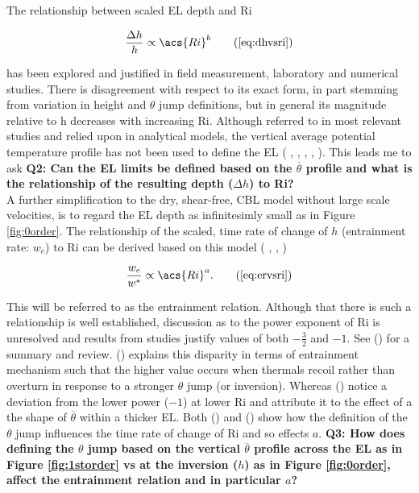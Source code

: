 The relationship between scaled \acs{EL} depth and \acs{Ri} 

\begin{equation} 
\frac{\Delta h}{h} \propto  \acs{Ri}^{b} \tag{\ref{eq:dhvsri}}
\end{equation}

has been explored and justified in field measurement, laboratory and numerical studies.  There is disagreement with respect to its exact form, in part stemming from variation in height and $\theta$ jump definitions, but in general its magnitude relative to h decreases with increasing \acs{Ri}. Although referred to in most relevant studies and relied upon in analytical models, the vertical average potential temperature profile has not been used to define the \acs{EL} (\citeauthor{DearWill80} \citeyear{DearWill80}, \citeauthor{StullNelEl} \citeyear{StullNelEl}, \citeauthor{FedConzMir04} \citeyear{FedConzMir04}, \citeauthor{Boers89} \citeyear{Boers89}, \citeauthor{BrooksFowler2} \citeyear{BrooksFowler2}). This leads me to ask \textbf{Q2: Can the \acs{EL} limits be defined based on the $\overline{\theta}$ profile and what is the relationship of the resulting depth ($\Delta h$) to \acs{Ri}?}\\


A further simplification to the dry, shear-free, \acs{CBL} model without large scale velocities, is to regard the \acs{EL} depth as infinitesimly small as in Figure \ref{fig:0order}.  The relationship of the scaled, time rate of change of $h$ (entrainment rate: $w_{e}$) to \acs{Ri} can be derived based on this model (\citeauthor{Tennekes73} \citeyear{Tennekes73}, \citeauthor{Deardorff79} \citeyear{Deardorff79}, \citeauthor{FedConzMir04} \citeyear{FedConzMir04})

\begin{equation}
\frac{w_{e}}{w^{*}} \propto  \acs{Ri}^{a}.\tag{\ref{eq:ervsri}} 
\end{equation}
 
This will be referred to as the entrainment relation.  Although that there is such a relationship is well established, discussion as to the power exponent of \acs{Ri} is unresolved and results from studies justify values of both $-\frac{3}{2}$ and $-1$. See \citeauthor{Traum11} (\citeyear{Traum11}) for a summary and review.  \citeauthor{Turner86} (\citeyear{Turner86}) explains this disparity in terms of entrainment mechanism such that the higher value occurs when thermals recoil rather than overturn in response to a stronger $\theta$ jump (or inversion).  Whereas \citeauthor{SullMoengStev} (\citeyear{SullMoengStev}) notice a deviation from the lower power ($-1$) at lower \acs{Ri} and attribute it to the effect of a the shape of $\overline{\theta}$ within a thicker \acs{EL}.  Both \citeauthor{FedConzMir04} (\citeyear{FedConzMir04}) and \citeauthor{GarciaMellado} (\citeyear{GarciaMellado}) show how the definition of the $\theta$ jump influences the time rate  of change of \acs{Ri} and so effects $a$. \textbf{Q3: How does defining the $\theta$ jump based on the vertical $\overline{\theta}$ profile across the \acs{EL} as in Figure \ref{fig:1storder} vs at the inversion ($h$) as in Figure \ref{fig:0order}, affect the entrainment relation and in particular $a$?}\\


